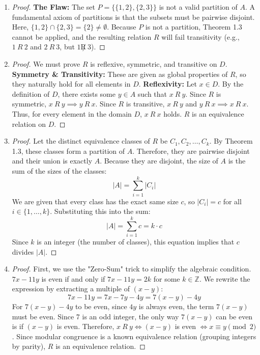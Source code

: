 \documentclass[11pt, a4paper]{article}
\theoremstyle{definition}
\theoremstyle{remark}
\newcommand{\Z}{\mathbb{Z}}
\begin{document}
\begin{enumerate}[label=\textbf{\arabic*.}, leftmargin=*]
    \item \begin{proof}
    \textbf{The Flaw:} The set $P = \{\{1, 2\}, \{2, 3\}\}$ is not a valid partition of $A$. A fundamental axiom of partitions is that the subsets must be pairwise disjoint. Here, $\{1, 2\} \cap \{2, 3\} = \{2\} \neq \emptyset$. Because $P$ is not a partition, Theorem 1.3 cannot be applied, and the resulting relation $R$ will fail transitivity (e.g., $1 \ R \ 2$ and $2 \ R \ 3$, but $1 \not R \ 3$).
    \end{proof}

    \item \begin{proof}
    We must prove $R$ is reflexive, symmetric, and transitive on $D$.
    \textbf{Symmetry \& Transitivity:} These are given as global properties of $R$, so they naturally hold for all elements in $D$.
    \textbf{Reflexivity:} Let $x \in D$. By the definition of $D$, there exists some $y \in A$ such that $x \ R \ y$.
    Since $R$ is symmetric, $x \ R \ y \implies y \ R \ x$.
    Since $R$ is transitive, $x \ R \ y$ and $y \ R \ x \implies x \ R \ x$.
    Thus, for every element in the domain $D$, $x \ R \ x$ holds. $R$ is an equivalence relation on $D$.
    \end{proof}

    \item \begin{proof}
    Let the distinct equivalence classes of $R$ be $C_1, C_2, \dots, C_k$.
    By Theorem 1.3, these classes form a partition of $A$. Therefore, they are pairwise disjoint and their union is exactly $A$.
    Because they are disjoint, the size of $A$ is the sum of the sizes of the classes:
    \[ |A| = \sum_{i=1}^k |C_i| \]
    We are given that every class has the exact same size $c$, so $|C_i| = c$ for all $i \in \{1, \dots, k\}$.
    Substituting this into the sum:
    \[ |A| = \sum_{i=1}^k c = k \cdot c \]
    Since $k$ is an integer (the number of classes), this equation implies that $c$ divides $|A|$.
    \end{proof}

    \item \begin{proof}
    First, we use the "Zero-Sum" trick to simplify the algebraic condition.
    $7x - 11y$ is even if and only if $7x - 11y = 2k$ for some $k \in \Z$.
    We rewrite the expression by extracting a multiple of $(x - y)$:
    \[ 7x - 11y = 7x - 7y - 4y = 7(x - y) - 4y \]
    For $7(x - y) - 4y$ to be even, since $4y$ is always even, the term $7(x - y)$ must be even.
    Since 7 is an odd integer, the only way $7(x - y)$ can be even is if $(x - y)$ is even.
    Therefore, $x \ R \ y \iff (x - y)$ is even $\iff x \equiv y \pmod 2$.
    Since modular congruence is a known equivalence relation (grouping integers by parity), $R$ is an equivalence relation.
    \end{proof}

\end{enumerate}
\end{document}

